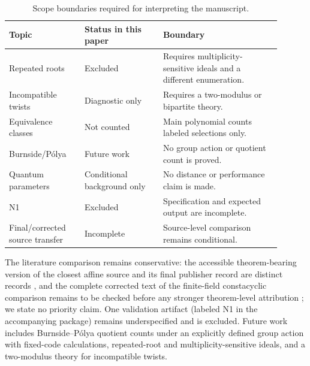 \documentclass[11pt]{article}
\theoremstyle{plain}
\theoremstyle{definition}
\theoremstyle{remark}
\begin{document}
\begin{table}[ht]
\centering
\caption{Scope boundaries required for interpreting the manuscript.}
\label{tab:scope}
\small
\begin{tabular}{|L{0.25\linewidth}|L{0.26\linewidth}|L{0.39\linewidth}|}
\hline
Topic & Status in this paper & Boundary \\
\hline
Repeated roots & Excluded & Requires multiplicity-sensitive ideals and a different enumeration. \\
\hline
Incompatible twists & Diagnostic only & Requires a two-modulus or bipartite theory. \\
\hline
Equivalence classes & Not counted & Main polynomial counts labeled selections only. \\
\hline
Burnside/P\'olya & Future work & No group action or quotient count is proved. \\
\hline
Quantum parameters & Conditional background only & No distance or performance claim is made. \\
\hline
N1 & Excluded & Specification and expected output are incomplete. \\
\hline
Final/corrected source transfer & Incomplete & Source-level comparison remains conditional. \\
\hline
\end{tabular}
\end{table}

The literature comparison remains conservative: the accessible theorem-bearing version of the closest affine source and its final publisher record are distinct records \cite{debnathAffinePreprint,debnathAffine2026}, and the complete corrected text of the finite-field constacyclic comparison remains to be checked before any stronger theorem-level attribution \cite{debnathConstacyclic2023,debnathCorrection2023}; we state no priority claim. One validation artifact (labeled N1 in the accompanying package) remains underspecified and is excluded. Future work includes Burnside--P\'olya quotient counts under an explicitly defined group action with fixed-code calculations, repeated-root and multiplicity-sensitive ideals, and a two-modulus theory for incompatible twists.



\end{document}
